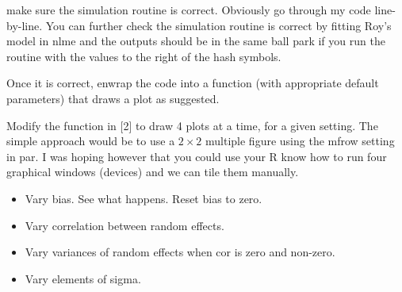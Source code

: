 \documentclass[a4paper,12pt]{article}
\begin{document}
%
%
%




make sure the simulation routine is correct. Obviously go through my code line-by-line. You can further check the simulation routine is correct by fitting Roy's model in nlme and the outputs should be in the same ball park if you run the routine with the values to the right of the hash symbols.



 Once it is correct, enwrap the code into a function (with appropriate default parameters) that draws a plot as suggested.



Modify the function in [2] to draw 4 plots at a time, for a given setting. The simple approach would be to use a $2\times2$ multiple figure using the mfrow setting in par. I was hoping however that you could use your R know how to run four graphical windows (devices) and we can tile them manually.


\begin{itemize}
\item Vary bias. See what happens. Reset bias to zero.
\item Vary correlation between random effects.
\item Vary variances of random effects when cor is zero and non-zero.
\item  Vary elements of sigma.
\end{itemize}
\end{document}
